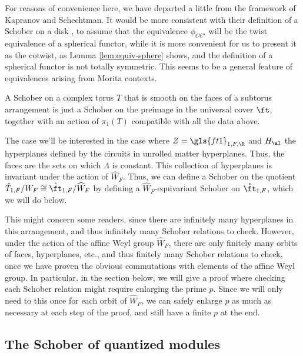 \begin{remark}
  For reasons of convenience here, we have departed a little from the framework of Kapranov and Schechtman.  It would be more consistent with their definition of a Schober on a disk \cite{KSschobers}, to assume that the equivalence $\phi_{CC'}$ will be the twist equivalence of a spherical functor, while it is more convenient for us to present it as the cotwist, as Lemma \ref{lem:equiv-sphere} shows, and the definition of a spherical functor is not totally symmetric. This seems to be a general feature of equivalences arising from Morita contexts.  
\end{remark}

A Schober on a complex torus $T$ that is smooth on the faces of a subtorus arrangement is just a Schober on the preimage in the universal cover $\ft$, together with an action of $\pi_1(T)$
compatible with all the data above.  

The case we'll be interested in the case where $Z=\gls{ft1}_{1,F,\R}$ and $H_\al$ the hyperplanes defined by the circuits in unrolled matter hyperplanes. Thus, the faces are the sets on which $\Lambda$ is constant.  
This collection of hyperplanes is invariant under the action of $\widehat{W}_F$.  Thus, we can define a Schober on the quotient $\mathring{T}_{1,F}/W_F\cong \mathring{\ft}_{1,F}/\widehat{W}_F$ by defining a $\widehat{W}_F$-equivariant Schober on $\mathring{\ft}_{1,F}$, which we will do below.  


This might concern some readers, since there are infinitely many hyperplanes in this arrangement, and thus infinitely many Schober relations to check.  However, under the action of the affine Weyl group $\widehat{W}_F$, there are only finitely many orbits of faces, hyperplanes, etc., and thus finitely many Schober relations to check, once we have proven the obvious commutations with elements of the affine Weyl group.  In particular, in the section below, we will give a proof where checking each Schober relation might require enlarging the prime $p$.  Since we will only need to this once for each orbit of $\widehat{W}_F$, we can safely enlarge $p$ as much as necessary at each step of the proof, and still have a finite $p$ at the end.  

\subsection{The Schober of quantized modules}
\label{sec:schob-quant-modul}

